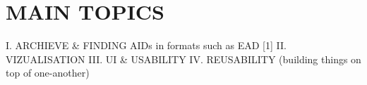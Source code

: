 
\section{MAIN TOPICS}

I. 	ARCHIEVE & FINDING AIDs in formats such as EAD [1]
II. 	VIZUALISATION
III.  	UI & USABILITY
IV.	REUSABILITY (building things on top of one-another)


